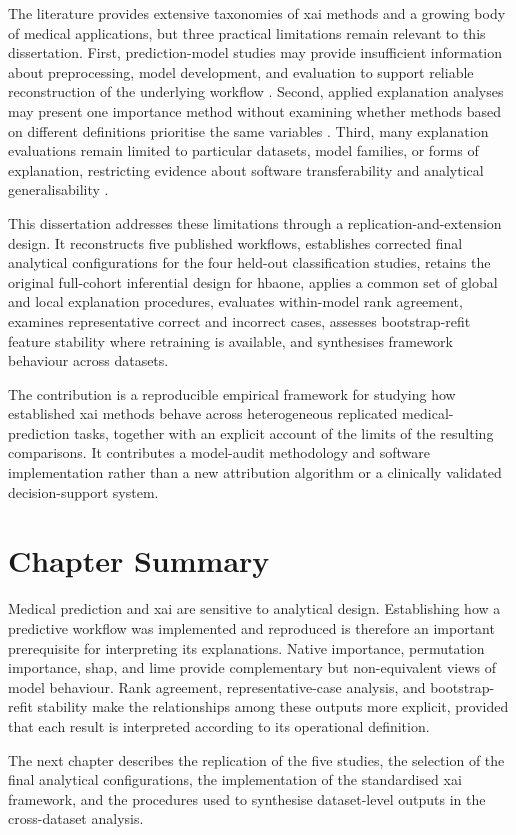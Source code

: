 The literature provides extensive taxonomies of \gls{xai} methods and a growing body of medical applications, but three practical limitations remain relevant to this dissertation. First, prediction-model studies may provide insufficient information about preprocessing, model development, and evaluation to support reliable reconstruction of the underlying workflow \citep{collins_tripodai_2024, moons_probastai_2025}. Second, applied explanation analyses may present one importance method without examining whether methods based on different definitions prioritise the same variables \citep{mohseni_multidisciplinary_2021, lofstrom_meta_2022}. Third, many explanation evaluations remain limited to particular datasets, model families, or forms of explanation, restricting evidence about software transferability and analytical generalisability \citep{lofstrom_meta_2022, canha_functionally-grounded_2025}.

This dissertation addresses these limitations through a replication-and-extension design. It reconstructs five published workflows, establishes corrected final analytical configurations for the four held-out classification studies, retains the original full-cohort inferential design for \gls{hbaone}, applies a common set of global and local explanation procedures, evaluates within-model rank agreement, examines representative correct and incorrect cases, assesses bootstrap-refit feature stability where retraining is available, and synthesises framework behaviour across datasets.


The contribution is a reproducible empirical framework for studying how established \gls{xai} methods behave across heterogeneous replicated medical-prediction tasks, together with an explicit account of the limits of the resulting comparisons. It contributes a model-audit methodology and software implementation rather than a new attribution algorithm or a clinically validated decision-support system.

\section{Chapter Summary}

Medical prediction and \gls{xai} are sensitive to analytical design. Establishing how a predictive workflow was implemented and reproduced is therefore an important prerequisite for interpreting its explanations. Native importance, permutation importance, \gls{shap}, and \gls{lime} provide complementary but non-equivalent views of model behaviour. Rank agreement, representative-case analysis, and bootstrap-refit stability make the relationships among these outputs more explicit, provided that each result is interpreted according to its operational definition.

The next chapter describes the replication of the five studies, the selection of the final analytical configurations, the implementation of the standardised \gls{xai} framework, and the procedures used to synthesise dataset-level outputs in the cross-dataset analysis.
